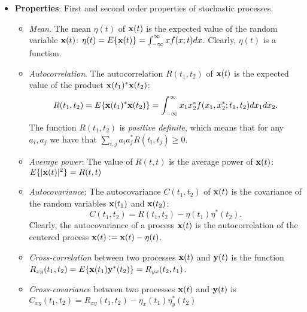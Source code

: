 \documentclass[a4paper, oneside]{book}
\begin{document}
\begin{itemize}
\item \textbf{Properties}: First and second order properties of stochastic processes.
\begin{itemize}
\item \textit{Mean}. The mean $\eta(t)$ of $\mathbf x(t)$ is the expected value of the random variable $\mathbf x(t)$: $\eta(t) = E\{\mathbf x(t)\}=\int_{-\infty}^{\infty} x f(x; t) dx$. Clearly, $\eta(t)$ is a function.
\item \textit{Autocorrelation}. The autocorrelation $R(t_1,t_2)$ of $\mathbf x(t)$ is the expected value of the product $\mathbf x(t_1)^* \mathbf x(t_2)$: 
\begin{equation}
R(t_1,t_2) = E\{\mathbf x(t_1)^* \mathbf x(t_2)\} = \int_{-\infty}^{\infty} x_1 x_2^* f(x_1,x_2^*; t_1,t_2)dx_1 dx_2.
\end{equation}
The function $R(t_1,t_2)$ is \textit{positive definite}, which means that for any $a_i, a_j$ we have that $\sum_{i,j} a_i a_j^* R(t_i,t_j)\ge 0$.
\item \textit{Average power}: The value of $R(t,t)$ is the average power of $\mathbf x(t)$: $E\{ |\mathbf x(t)|^2\}=R(t,t)$
\item \textit{Autocovariance}: The autocovariance $C(t_1,t_2)$ of $\mathbf x(t)$ is the covariance of the random variables $\mathbf x(t_1)$ and $\mathbf x(t_2)$:
\begin{equation}
C(t_1,t_2) = R(t_1, t_2) - \eta(t_1)\eta^*(t_2).
\end{equation}
Clearly, the autocovariance of a process $\mathbf x(t)$ is the autocorrelation of the centered process $\mathbf x(t):=\mathbf x(t)-\eta (t)$.
\item \textit{Cross-correlation} between two processes $\mathbf x(t)$ and $\mathbf y(t)$ is the function $R_{xy}(t_1, t_2)=E\{\mathbf x(t_1) \mathbf y^*(t_2)\}=R_{yx}(t_2,t_1)$.
\item \textit{Cross-covariance} between two processes $\mathbf x(t)$ and $\mathbf y(t)$ is $C_{xy}(t_1,t_2) = R_{xy}(t_1,t_2)-\eta_x(t_1)\eta_y^*(t_2)$
\end{itemize}


\end{itemize}
\end{document}
